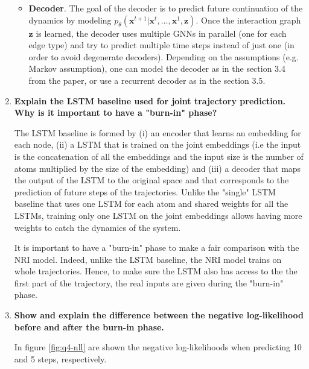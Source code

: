 \documentclass[a4paper, 11pt]{report}
\begin{document}
\begin{enumerate}
\begin{itemize}
	    \item \textbf{Decoder}. The goal of the decoder is to predict future continuation of the dynamics by modeling $p_{\theta} \left( \mathbf{x}^{t+1} | \mathbf{x}^{t}, \dots, \mathbf{x}^{1}, \mathbf{z} \right)$. Once the interaction graph $\mathbf{z}$ is learned, the decoder uses multiple GNNs in parallel (one for each edge type) and try to predict multiple time steps instead of just one (in order to avoid degenerate decoders). Depending on the assumptions (e.g. Markov assumption), one can model the decoder as in the section 3.4 from the paper, or use a recurrent decoder as in the section 3.5.
	\end{itemize}
	
	\item \textbf{Explain the LSTM baseline used for joint trajectory prediction. Why is it important to have a "burn-in" phase?}
	
	The LSTM baseline is formed by (i) an encoder that learns an embedding for each node, (ii) a LSTM that is trained on the joint embeddings (i.e the input is the concatenation of all the embeddings and the input size is the number of atoms multiplied by the size of the embedding) and (iii) a decoder that maps the output of the LSTM to the original space and that corresponds to the prediction of future steps of the trajectories. Unlike the "single" LSTM baseline that uses one LSTM for each atom and shared weights for all the LSTMs, training only one LSTM on the joint embeddings allows having more weights to catch the dynamics of the system.
	
	It is important to have a "burn-in" phase to make a fair comparison with the NRI model. Indeed, unlike the LSTM baseline, the NRI model trains on whole trajectories. Hence, to make sure the LSTM also has access to the the first part of the trajectory, the real inputs are given during the "burn-in" phase.
	
	\item \textbf{Show and explain the difference between the negative log-likelihood before and after the burn-in phase.}
	
	In figure \ref{fig:q4-nll} are shown the negative log-likelihoods when predicting 10 and 5 steps, respectively.
	

\end{enumerate}
\end{document}
